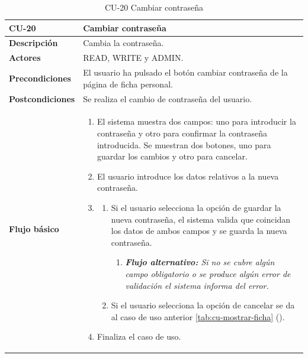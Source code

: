 \begin{table} [H]
    \centering
    \setlength{\leftmargini}{0.4cm}
	\resizebox{15cm}{!} { %
    \begin{tabular}{| m{3cm} | m{12cm} |}   
    \hline
	  \textbf{CU-20} & \textbf{Cambiar contraseña} \\\hline
	  \textbf{Descripción} & Cambia la contraseña. \\\hline
	  \textbf{Actores} & READ, WRITE y ADMIN. \\\hline
	  \textbf{Precondiciones} & El usuario ha pulsado el botón cambiar contraseña de la página de ficha personal. \\\hline
	  \textbf{Postcondiciones} & Se realiza el cambio de contraseña del usuario. \\\hline
	  \textbf{Flujo básico} & 
		\begin{enumerate}
	  	\item El sistema muestra dos campos: uno para introducir la contraseña y otro para confirmar la contraseña introducida. Se muestran dos botones, uno para guardar los cambios y otro para cancelar.
	  	\item El usuario introduce los datos relativos a la nueva contraseña.
		\item 
		\begin{enumerate}		
			\item Si el usuario selecciona la opción de guardar la nueva contraseña, el sistema valida que coincidan los datos de ambos campos y se guarda la nueva contraseña.
			\begin{enumerate}	
			   \item \textit{\textbf{Flujo alternativo:} Si no se cubre algún campo obligatorio o se produce algún error de validación el sistema informa del error.}		   
			\end{enumerate}
			\item Si el usuario selecciona la opción de cancelar se da al caso de uso anterior \ref{tab:cu-mostrar-ficha} (\pageref{tab:cu-mostrar-ficha}).
		\end{enumerate}
	   	\item Finaliza el caso de uso.
	  \end{enumerate} 	  	  
	  \\\hline
    \end{tabular}
    } %
    \caption{CU-20 Cambiar contraseña}
    \label{tab:cu-cambiar-contrasenha}
\end{table}



